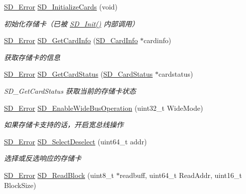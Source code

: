 \begin{DoxyCompactItemize}
\hyperlink{group__sd__card_gacff91fa68daa1d1ee967b5b3fb3dbd8c}{S\+D\+\_\+\+Error} \hyperlink{group__sd__card_gab39f671413ee824a13bf1bd833f724e9}{S\+D\+\_\+\+Initialize\+Cards} (void)
\begin{DoxyCompactList}\small\item\em 初始化存储卡（已被 \hyperlink{group__sd__card_ga3c927d4d98ffb6f3cc2442b09c19926c}{S\+D\+\_\+\+Init()} 内部调用） \end{DoxyCompactList}\item 
\hyperlink{group__sd__card_gacff91fa68daa1d1ee967b5b3fb3dbd8c}{S\+D\+\_\+\+Error} \hyperlink{group__sd__card_ga5348c3c8f17f8c704bf00f1c5e21549d}{S\+D\+\_\+\+Get\+Card\+Info} (\hyperlink{struct_s_d___card_info}{S\+D\+\_\+\+Card\+Info} $\ast$cardinfo)
\begin{DoxyCompactList}\small\item\em 获取存储卡的信息 \end{DoxyCompactList}\item 
\hyperlink{group__sd__card_gacff91fa68daa1d1ee967b5b3fb3dbd8c}{S\+D\+\_\+\+Error} \hyperlink{group__sd__card_ga858e0742dd01b2e2f6f397d30de6428f}{S\+D\+\_\+\+Get\+Card\+Status} (\hyperlink{struct_s_d___card_status}{S\+D\+\_\+\+Card\+Status} $\ast$cardstatus)
\begin{DoxyCompactList}\small\item\em S\+D\+\_\+\+Get\+Card\+Status 获取当前的存储卡状态 \end{DoxyCompactList}\item 
\hyperlink{group__sd__card_gacff91fa68daa1d1ee967b5b3fb3dbd8c}{S\+D\+\_\+\+Error} \hyperlink{group__sd__card_ga6569e73a229e639d2043549942d58d11}{S\+D\+\_\+\+Enable\+Wide\+Bus\+Operation} (uint32\+\_\+t Wide\+Mode)
\begin{DoxyCompactList}\small\item\em 如果存储卡支持的话，开启宽总线操作 \end{DoxyCompactList}\item 
\hyperlink{group__sd__card_gacff91fa68daa1d1ee967b5b3fb3dbd8c}{S\+D\+\_\+\+Error} \hyperlink{group__sd__card_ga849eb0b385337453139a7567898dacb7}{S\+D\+\_\+\+Select\+Deselect} (uint64\+\_\+t addr)
\begin{DoxyCompactList}\small\item\em 选择或反选响应的存储卡 \end{DoxyCompactList}\item 
\hyperlink{group__sd__card_gacff91fa68daa1d1ee967b5b3fb3dbd8c}{S\+D\+\_\+\+Error} \hyperlink{group__sd__card_ga1b2b4c1bf25da0771325b00cd638129d}{S\+D\+\_\+\+Read\+Block} (uint8\+\_\+t $\ast$readbuff, uint64\+\_\+t Read\+Addr, uint16\+\_\+t Block\+Size)

\end{DoxyCompactItemize}
